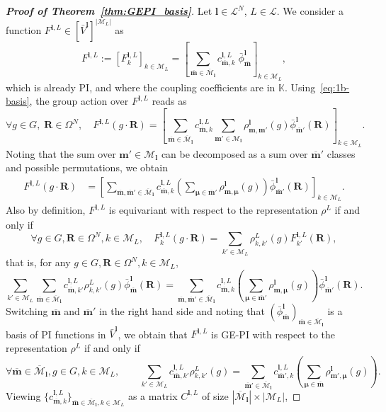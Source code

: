 \documentclass{article}
\newcommand{\rep}[2]{\rho^{#1}_{#2}}
\newcommand{\bphi}[2]{\bar\phi^{#1}_{#2}}
\newcommand{\bV}{{\bar V}}
\newcommand{\card}[1]{|{#1}|}
\numberwithin{equation}{section}
\def\K{\mathbb{K}}
\def\bl{{\bm l}}
\def\bbm{{\bm m}}
\def\bmu{{\bm \mu}}
\def\bR{{\bm R}}
\def\obm{{\overline\bbm}}
\def\calM{\mathcal{M}}
\def\calL{\mathcal{L}}
\def\oMl{\overline{\calM}_\bl}
\def\Nat{{N}}
\begin{document}
\begin{proof}[\bf{Proof of Theorem~\ref{thm:GEPI_basis}}]
   Let $\bl\in\calL^N$, $L\in \calL$.
   We consider a function  $F^{\bl,L}\in [\bV^\bl]^{\card{\calM_L}}$ as 
   \begin{equation*}
      F^{\bl,L} := 
    \left[ F^{\bl,L}_{k} \right]_{k\in\calM_L}
    = 
    \left[ \sum_{\obm \in \oMl} c_{\obm,k}^{\bl,L} \; \bphi{\bl}{\obm} \right]_{k\in\calM_L},
\end{equation*}
which is already PI, and where the coupling coefficients are in $\K$.
   Using~\eqref{eq:1b-basis}, the group action over $F^{\bl,L}$ reads as 
\[
   \forall g\in G,\; \bR\in \Omega^\Nat, \quad F^{\bl,L}(g \cdot \bR) =  \left[ \sum_{\obm \in \oMl} c_{\obm,k}^{\bl,L} \sum_{\bbm' \in \calM_\bl} \rep{\bl}{\bbm,\bbm'}(g) \bphi{\bl}{\obm'}(\bR) \right]_{k\in\calM_L}.
\]
Noting that the sum over $\bbm' \in \calM_\bl$ can be decomposed as a sum over $\obm'$ classes and possible permutations, we obtain
\begin{equation*}
\begin{split}
    F^{\bl,L}(g \cdot \bR) & 
     =  \left[ \sum_{\obm,\obm' \in \oMl} c_{\obm,k}^{\bl,L} \left( \sum_{\bmu\in\obm'}\rep{\bl}{\bbm,\bmu}(g) \right) \bphi{\bl}{\obm'}(\bR) \right]_{k\in\calM_L}.
\end{split}
\end{equation*}
Also by definition, $F^{\bl,L}$ is equivariant with respect to the representation $\rep{L}{}$ if and only if
\[
    \forall g\in G, \bR\in\Omega^\Nat, k\in \calM_L, 
    \quad F^{\bl,L}_{k}(g \cdot \bR) = \sum_{k'\in\calM_L} \rep{L}{k,k'}(g)F_{k'}^{\bl,L}(\bR),
\]
that is, for any $g\in G, \bR\in\Omega^\Nat, k\in\calM_L,$
\[ 
   \sum_{k'\in\calM_L} \sum_{\obm \in \oMl} c_{\obm,k'}^{\bl,L} \rep{L}{k,k'}(g) \bphi{\bl}{\obm}(\bR)
   = 
   \sum_{\obm,\obm' \in \oMl} c_{\obm,k}^{\bl,L} 
   \left( \sum_{\bmu\in\obm'}\rep{\bl}{\bbm,\bmu}(g) \right)
   \bphi{\bl}{\obm'}(\bR).
\]
Switching $\obm$ and $\obm'$ in the right hand side and noting that $(\bphi{\bl}{\obm})_{\obm\in \oMl}$ is a basis of PI functions in $\bV^\bl$, we obtain that $F^{\bl,L}$ is GE-PI with respect to the representation $\rep{L}{}$ if and only if
\begin{equation}\label{eq:GEPI-coeff}
\forall \obm \in \oMl, g\in G, k\in\calM_L, \qquad
     \sum_{k'\in\calM_L}c_{\obm,k'}^{\bl,L} 
     \rep{L}{k,k'}(g)  
   = \sum_{\obm' \in \oMl} c_{\obm',k}^{\bl,L} 
   \left( \sum_{\bmu\in\obm}\rep{\bl}{\bbm',\bmu}(g) \right). 
\end{equation}
Viewing $\{c_{\obm,k}^{\bl,L}\}_{\obm\in\oMl,k\in\mathcal{M}_L}$ as a matrix $C^{\bl,L}$ of size $\card{\oMl}\times\card{\mathcal{M}_L}$,

\end{proof}
\end{document}
